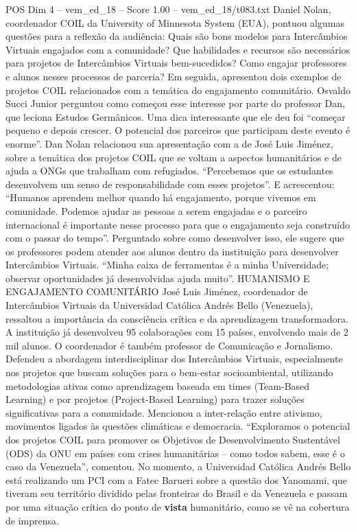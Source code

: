 \begin{textsample}{POS Dim 4 – vem\_ed\_18 – Score 1.00 – vem\_ed\_18/t083.txt}  \label{ex:f4_pos_048}
Daniel Nolan, coordenador COIL da University of Minnesota System (EUA), pontuou algumas questões para a reflexão da audiência: Quais são bons modelos para Intercâmbios Virtuais engajados com a comunidade?
Que habilidades e recursos são necessários para projetos de Intercâmbios Virtuais bem-sucedidos?
Como engajar professores e alunos nesses processos de parceria?
Em seguida, apresentou dois exemplos de projetos COIL relacionados com a temática do engajamento comunitário.
Osvaldo Succi Junior perguntou como começou esse interesse por parte do professor Dan, que leciona Estudos Germânicos.
Uma dica interessante que ele deu foi “começar pequeno e depois crescer.
O potencial dos parceiros que participam deste evento é enorme”.
Dan Nolan relacionou sua apresentação com a de José Luis Jiménez, sobre a temática dos projetos COIL que se voltam a aspectos humanitários e de ajuda a ONGs que trabalham com refugiados. “Percebemos que os estudantes desenvolvem um senso de responsabilidade com esses projetos”.
E acrescentou: “Humanos aprendem melhor quando há engajamento, porque vivemos em comunidade.
Podemos ajudar as pessoas a serem engajadas e o parceiro internacional é importante nesse processo para que o engajamento seja construído com o passar do tempo”.
Perguntado sobre como desenvolver isso, ele sugere que os professores podem atender aos alunos dentro da instituição para desenvolver Intercâmbios Virtuais. “Minha caixa de ferramentas é a minha Universidade; observar oportunidades já desenvolvidas ajuda muito”.
HUMANISMO E ENGAJAMENTO COMUNITÁRIO José Luis Jiménez, coordenador de Intercâmbios Virtuais da Universidad Católica Andrés Bello (Venezuela), ressaltou a importância da consciência crítica e da aprendizagem transformadora.
A instituição já desenvolveu 95 colaborações com 15 países, envolvendo mais de 2 mil alunos.
O coordenador é também professor de Comunicação e Jornalismo.
Defendeu a abordagem interdisciplinar dos Intercâmbios Virtuais, especialmente nos projetos que buscam soluções para o bem-estar socioambiental, utilizando metodologias ativas como aprendizagem baseada em times (Team-Based Learning) e por projetos (Project-Based Learning) para trazer soluções significativas para a comunidade.
Mencionou a inter-relação entre ativismo, movimentos ligados às questões climáticas e democracia. “Exploramos o potencial dos projetos COIL para promover os Objetivos de Desenvolvimento Sustentável (ODS) da ONU em países com crises humanitárias – como todos sabem, esse é o caso da Venezuela”, comentou.
No momento, a Universidad Católica Andrés Bello está realizando um PCI com a Fatec Barueri sobre a questão dos Yanomami, que tiveram seu território dividido pelas fronteiras do Brasil e da Venezuela e passam por uma situação crítica do ponto de \textbf{vista} humanitário, como se vê na cobertura de imprensa.

\end{textsample}
